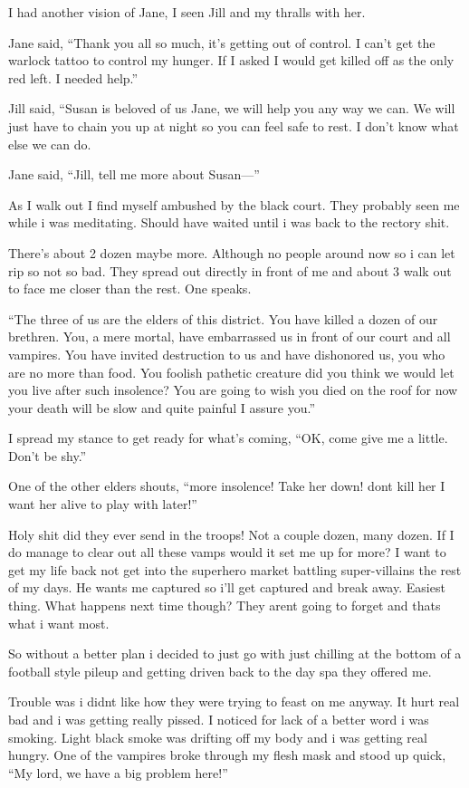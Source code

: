 I had another vision of Jane, I seen Jill and my thralls with her.

Jane said, ``Thank you all so much, it's getting out of control. I can't get the warlock tattoo to control my hunger. If I asked I would get killed off as the only red left. I needed help.''

Jill said, ``Susan is beloved of us Jane, we will help you any way we can. We will just have to chain you up at night so you can feel safe to rest. I don't know what else we can do.

Jane said, ``Jill, tell me more about Susan---''

As I walk out I find myself ambushed by the black court. They probably seen me while i was meditating. Should have waited until i was back to the rectory shit.

There's about 2 dozen maybe more. Although no people around now so i can let rip so not so bad. They spread out directly in front of me and about 3 walk out to face me closer than the rest. One speaks.

``The three of us are the elders of this district. You have killed a dozen of our brethren. You, a mere mortal, have embarrassed us in front of our court and all vampires. You have invited destruction to us and have dishonored us, you who are no more than food. You foolish pathetic creature did you think we would let you live after such insolence? You are going to wish you died on the roof for now your death will be slow and quite painful I assure you.''

I spread my stance to get ready for what's coming, ``OK, come give me a little. Don't be shy.''

One of the other elders shouts, ``more insolence! Take her down! dont kill her I want her alive to play with later!''

Holy shit did they ever send in the troops! Not a couple dozen, many dozen. If I do manage to clear out all these vamps would it set me up for more? I want to get my life back not get into the superhero market battling super-villains the rest of my days. He wants me captured so i'll get captured and break away. Easiest thing. What happens next time though? They arent going to forget and thats what i want most.

So without a better plan i decided to just go with just chilling at the bottom of a football style pileup and getting driven back to the day spa they offered me.

Trouble was i didnt like how they were trying to feast on me anyway. It hurt real bad and i was getting really pissed. I noticed for lack of a better word i was smoking. Light black smoke was drifting off my body and i was getting real hungry. One of the vampires broke through my flesh mask and stood up quick, ``My lord, we have a big problem here!'' 


